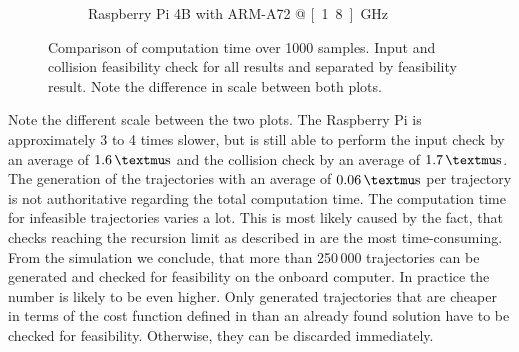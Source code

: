 \begin{figure}
\begin{subfigure}[t]{0.49\textwidth}
	\caption{Raspberry Pi 4B with ARM-A72 @ \unit[1.8]{GHz}}
	\label{fig:computation-time-pi}
	\end{subfigure}
	\caption{Comparison of computation time over 1000 samples. Input and collision feasibility check for all results and separated by feasibility result. Note the difference in scale between both plots.}
\end{figure}
Note the different scale between the two plots.
The Raspberry Pi is approximately 3 to 4 times slower, but is still able to perform the input check by an average of $\unit[1.6]{µs}$ and the collision check by an average of $\unit[1.7]{µs}$.
The generation of the trajectories with an average of $\unit[0.06]{µs}$ per trajectory is not authoritative regarding the total computation time.
The computation time for infeasible trajectories varies a lot.
This is most likely caused by the fact, that checks reaching the recursion limit as described in  are the most time-consuming.
From the simulation we conclude, that more than 250\,000 trajectories can be generated and checked for feasibility on the onboard computer. In practice the number is likely to be even higher.
Only generated trajectories that are cheaper in terms of the cost function defined in  than an already found solution have to be checked for feasibility. Otherwise, they can be discarded immediately.




